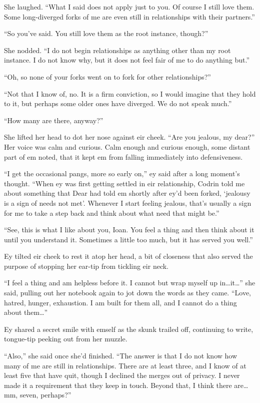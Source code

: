 She laughed. ``What I said does not apply just to you. Of course I still love them. Some long-diverged forks of me are even still in relationships with their partners.''

``So you've said. You still love them as the root instance, though?''

She nodded. ``I do not begin relationships as anything other than my root instance. I do not know why, but it does not feel fair of me to do anything but.''

``Oh, so none of your forks went on to fork for other relationships?''

``Not that I know of, no. It is a firm conviction, so I would imagine that they hold to it, but perhaps some older ones have diverged. We do not speak much.''

``How many are there, anyway?''

She lifted her head to dot her nose against eir cheek. ``Are you jealous, my dear?'' Her voice was calm and curious. Calm enough and curious enough, some distant part of em noted, that it kept em from falling immediately into defensiveness.

``I get the occasional pangs, more so early on,'' ey said after a long moment's thought. ``When ey was first getting settled in eir relationship, Codrin told me about something that Dear had told em shortly after ey'd been forked, `jealousy is a sign of needs not met'. Whenever I start feeling jealous, that's usually a sign for me to take a step back and think about what need that might be.''

``See, this is what I like about you, Ioan. You feel a thing and then think about it until you understand it. Sometimes a little too much, but it has served you well.''

Ey tilted eir cheek to rest it atop her head, a bit of closeness that also served the purpose of stopping her ear-tip from tickling eir neck.

``I feel a thing and am helpless before it. I cannot but wrap myself up in\ldots it\ldots{}'' she said, pulling out her notebook again to jot down the words as they came. ``Love, hatred, hunger, exhaustion. I am built for them all, and I cannot do a thing about them\ldots{}''

Ey shared a secret smile with emself as the skunk trailed off, continuing to write, tongue-tip peeking out from her muzzle.

``Also,'' she said once she'd finished. ``The answer is that I do not know how many of me are still in relationships. There are at least three, and I know of at least five that have quit, though I declined the merges out of privacy. I never made it a requirement that they keep in touch. Beyond that, I think there are\ldots mm, seven, perhaps?''

